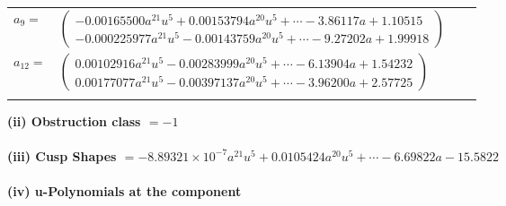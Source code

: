 \documentclass[1p]{elsarticle_modified}
\theoremstyle{definition}
\begin{document}
\begin{tabular}{m{7pt} m{180pt} m{7pt} m{180pt} }
\flushright $a_{9}=$&$\begin{pmatrix}-0.00165500 a^{21} u^{5}+0.00153794 a^{20} u^{5}+\cdots-3.86117 a+1.10515\\-0.000225977 a^{21} u^{5}-0.00143759 a^{20} u^{5}+\cdots-9.27202 a+1.99918\end{pmatrix}$ \\
\flushright $a_{12}=$&$\begin{pmatrix}0.00102916 a^{21} u^{5}-0.00283999 a^{20} u^{5}+\cdots-6.13904 a+1.54232\\0.00177077 a^{21} u^{5}-0.00397137 a^{20} u^{5}+\cdots-3.96200 a+2.57725\end{pmatrix}$\\&\end{tabular}
\flushleft \textbf{(ii) Obstruction class $= -1$}\\~\\
\flushleft \textbf{(iii) Cusp Shapes $= -8.89321\times10^{-7} a^{21} u^{5}+0.0105424 a^{20} u^{5}+\cdots-6.69822 a-15.5822$}\\~\\
\newpage\renewcommand{\arraystretch}{1}
\flushleft \textbf{(iv) u-Polynomials at the component}\newline \\
\end{document}
